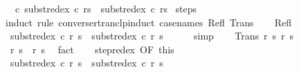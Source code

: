 \begin{isabellebody}
\ \ \ {\isachardoublequoteopen}{\isasymAnd}c{\isachardot}\ {\isasymGamma}{\isasymturnstile}{\isacharparenleft}subst{\isacharunderscore}redex\ c\ r{\isacharcomma}s{\isacharparenright}\ {\isasymrightarrow}\isactrlsup {\isacharasterisk}\ {\isacharparenleft}subst{\isacharunderscore}redex\ c\ r{\isacharprime}{\isacharcomma}s{\isacharprime}{\isacharparenright}{\isachardoublequoteclose}\isanewline
%
\isadelimproof
%
\endisadelimproof
%
\isatagproof
{}\isamarkupfalse%
\ steps\isanewline
{}\isamarkupfalse%
\ {\isacharparenleft}induct\ rule{\isacharcolon}\ converse{\isacharunderscore}rtranclp{\isacharunderscore}induct{}\ {\isacharbrackleft}case{\isacharunderscore}names\ Refl\ Trans{\isacharbrackright}{\isacharparenright}\isanewline
\ \ \isamarkupfalse%
\ Refl\ \isanewline
\ \ \isamarkupfalse%
\ {\isachardoublequoteopen}{\isasymGamma}{\isasymturnstile}\ {\isacharparenleft}subst{\isacharunderscore}redex\ c\ r{\isacharprime}{\isacharcomma}\ s{\isacharprime}{\isacharparenright}\ {\isasymrightarrow}\isactrlsup {\isacharasterisk}\ {\isacharparenleft}subst{\isacharunderscore}redex\ c\ r{\isacharprime}{\isacharcomma}\ s{\isacharprime}{\isacharparenright}{\isachardoublequoteclose}\isanewline
\ \ \ \ \isamarkupfalse%
\ simp\isanewline
{}\isamarkupfalse%
\isanewline
\ \ \isamarkupfalse%
\ {\isacharparenleft}Trans\ r\ s\ r{\isacharprime}{\isacharprime}\ s{\isacharprime}{\isacharprime}{\isacharparenright}\isanewline
\ \ \isamarkupfalse%
\ {\isachardoublequoteopen}{\isasymGamma}{\isasymturnstile}\ {\isacharparenleft}r{\isacharcomma}\ s{\isacharparenright}\ {\isasymrightarrow}\ {\isacharparenleft}r{\isacharprime}{\isacharprime}{\isacharcomma}\ s{\isacharprime}{\isacharprime}{\isacharparenright}{\isachardoublequoteclose}\ \isamarkupfalse%
\ fact\isanewline
\ \ \isamarkupfalse%
\ step{\isacharunderscore}redex\ {\isacharbrackleft}OF\ this{\isacharbrackright}\isanewline
\ \ \isamarkupfalse%
\ {\isachardoublequoteopen}{\isasymGamma}{\isasymturnstile}\ {\isacharparenleft}subst{\isacharunderscore}redex\ c\ r{\isacharcomma}\ s{\isacharparenright}\ {\isasymrightarrow}\ {\isacharparenleft}subst{\isacharunderscore}redex\ c\ r{\isacharprime}{\isacharprime}{\isacharcomma}\ s{\isacharprime}{\isacharprime}{\isacharparenright}{\isachardoublequoteclose}\isacommand{{\isachardot}}\isamarkupfalse%
\isanewline
\ \ \isamarkupfalse%
\ \ \isanewline
\ \ \isamarkupfalse%

\end{isabellebody}
